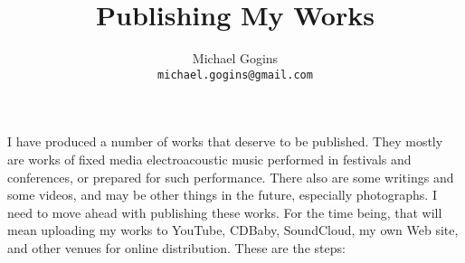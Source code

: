 \documentclass[english,11pt,letterpaper,onecolumn]{scrartcl}
\begin{document}
\title{Publishing My Works}
\author{Michael Gogins \\ \texttt{michael.gogins@gmail.com}}
\maketitle


I have produced a number of works that deserve to be published. They mostly are works of fixed media electroacoustic music performed in festivals and conferences, or prepared for such performance. There also are some writings and some videos, and may be other things in the future, especially photographs. I need to move ahead with publishing these works. For the time being, that will mean uploading my works to YouTube, CDBaby, SoundCloud, my own Web site, and other venues for online distribution. These are the steps:
\end{document}
